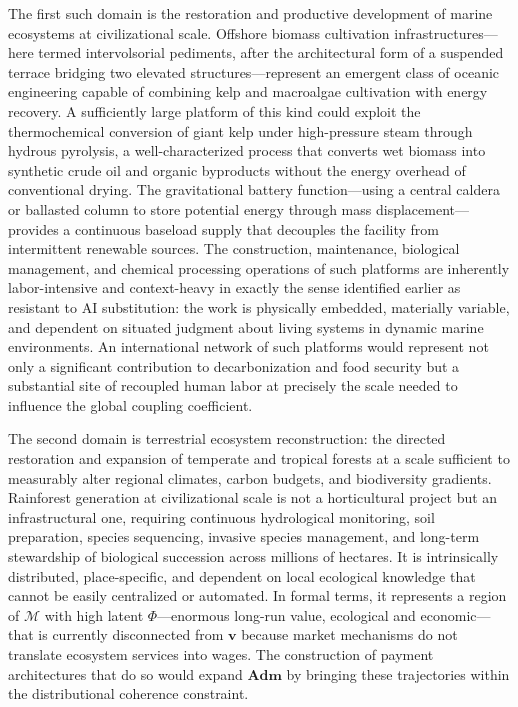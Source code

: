 \documentclass[11pt, a4paper]{article}
\theoremstyle{plain}
\theoremstyle{definition}
\newcommand{\Phifield}{\Phi}
\newcommand{\vfield}{\mathbf{v}}
\newcommand{\statespace}{\mathcal{M}}
\newcommand{\Adm}{\mathbf{Adm}}
\begin{document}
The first such domain is the restoration and productive development of marine
ecosystems at civilizational scale. Offshore biomass cultivation
infrastructures---here termed intervolsorial pediments, after the
architectural form of a suspended terrace bridging two elevated
structures---represent an emergent class of oceanic engineering capable of
combining kelp and macroalgae cultivation with energy recovery. A sufficiently
large platform of this kind could exploit the thermochemical conversion of
giant kelp under high-pressure steam through hydrous pyrolysis, a
well-characterized process that converts wet biomass into synthetic crude oil
and organic byproducts without the energy overhead of conventional drying.
The gravitational battery function---using a central caldera or ballasted
column to store potential energy through mass displacement---provides a
continuous baseload supply that decouples the facility from intermittent
renewable sources. The construction, maintenance, biological management, and
chemical processing operations of such platforms are inherently labor-intensive
and context-heavy in exactly the sense identified earlier as resistant to AI
substitution: the work is physically embedded, materially variable, and
dependent on situated judgment about living systems in dynamic marine
environments. An international network of such platforms would represent not
only a significant contribution to decarbonization and food security but a
substantial site of recoupled human labor at precisely the scale needed to
influence the global coupling coefficient.

The second domain is terrestrial ecosystem reconstruction: the directed
restoration and expansion of temperate and tropical forests at a scale
sufficient to measurably alter regional climates, carbon budgets, and
biodiversity gradients. Rainforest generation at civilizational scale is not a
horticultural project but an infrastructural one, requiring continuous
hydrological monitoring, soil preparation, species sequencing, invasive species
management, and long-term stewardship of biological succession across millions
of hectares. It is intrinsically distributed, place-specific, and dependent on
local ecological knowledge that cannot be easily centralized or automated.
In formal terms, it represents a region of $\statespace$ with high latent
$\Phifield$---enormous long-run value, ecological and economic---that is
currently disconnected from $\vfield$ because market mechanisms do not
translate ecosystem services into wages. The construction of payment
architectures that do so would expand $\Adm$ by bringing these trajectories
within the distributional coherence constraint.
\end{document}
